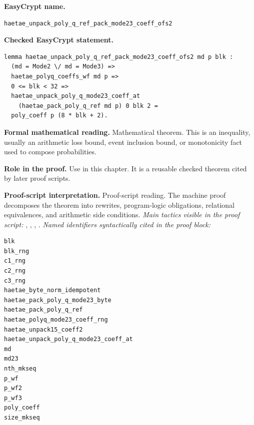 \begin{formaltheorem}
\noindent\textbf{EasyCrypt name.}
\begin{lstlisting}[language=EasyCrypt,basicstyle=\ttfamily\scriptsize]
haetae_unpack_poly_q_ref_pack_mode23_coeff_ofs2
\end{lstlisting}
\noindent\textbf{Checked EasyCrypt statement.}
\begin{lstlisting}[language=EasyCrypt,basicstyle=\ttfamily\scriptsize]
lemma haetae_unpack_poly_q_ref_pack_mode23_coeff_ofs2 md p blk :
  (md = Mode2 \/ md = Mode3) =>
  haetae_polyq_coeffs_wf md p =>
  0 <= blk < 32 =>
  haetae_unpack_poly_q_mode23_coeff_at
    (haetae_pack_poly_q_ref md p) 0 blk 2 =
  poly_coeff p (8 * blk + 2).
\end{lstlisting}
\noindent\textbf{Formal mathematical reading.}
Mathematical theorem. This is an inequality, usually an arithmetic loss bound, event inclusion bound, or monotonicity fact used to compose probabilities.

\noindent\textbf{Role in the proof.}
Use in this chapter. It is a reusable checked theorem cited by later proof scripts.

\noindent\textbf{Proof-script interpretation.}
Proof-script reading. The machine proof decomposes the theorem into rewrites, program-logic obligations, relational equivalences, and arithmetic side conditions.
\emph{Main tactics visible in the proof script:} , , , .
\emph{Named identifiers syntactically cited in the proof block:}
\begin{lstlisting}[language=EasyCrypt,basicstyle=\ttfamily\scriptsize]
blk
blk_rng
c1_rng
c2_rng
c3_rng
haetae_byte_norm_idempotent
haetae_pack_poly_q_mode23_byte
haetae_pack_poly_q_ref
haetae_polyq_mode23_coeff_rng
haetae_unpack15_coeff2
haetae_unpack_poly_q_mode23_coeff_at
md
md23
nth_mkseq
p_wf
p_wf2
p_wf3
poly_coeff
size_mkseq
\end{lstlisting}

\end{formaltheorem}

